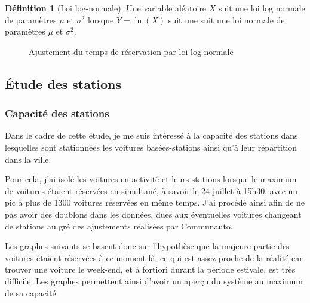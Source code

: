 \documentclass[12pt,a4paper]{article}
\newcommand{\1}[1]{\mathbbm{1}_{\{#1\}} }
\theoremstyle{definition}
\newtheorem{definition}{Définition}
\begin{document}
{\begin{figure}[h]
\end{figure}

\begin{definition}[Loi log-normale]
Une variable aléatoire $X$ suit une loi log normale de paramètres $\mu$ et $\sigma^2$ lorsque $Y = \ln(X)$ suit une suit une loi normale de paramètres $\mu$ et $\sigma^2$.
\end{definition}


\begin{figure}[!h]
\centering
{}
\caption{Ajustement du temps de réservation par loi log-normale}
\end{figure}

\subsection{Étude des stations}

\subsubsection{Capacité des stations}
Dans le cadre de cette étude, je me suis intéressé à la capacité des stations dans lesquelles sont stationnées les voitures basées-stations ainsi qu'à leur répartition dans la ville.

Pour cela, j'ai isolé les voitures en activité et leurs stations lorsque le maximum de voitures étaient réservées en simultané, à savoir le 24 juillet à 15h30, avec un pic à plus de 1300 voitures réservées en même temps. J'ai procédé ainsi afin de ne pas avoir des doublons dans les données, dues aux éventuelles voitures changeant de stations au gré des ajustements réalisées par Communauto.

Les graphes suivants se basent donc sur l'hypothèse que la majeure partie des voitures étaient réservées à ce moment là, ce qui est assez proche de la réalité car trouver une voiture le week-end, et à fortiori durant la période estivale, est très difficile.
Les graphes permettent ainsi d'avoir un aperçu du système au maximum de sa capacité.


}
\end{document}
